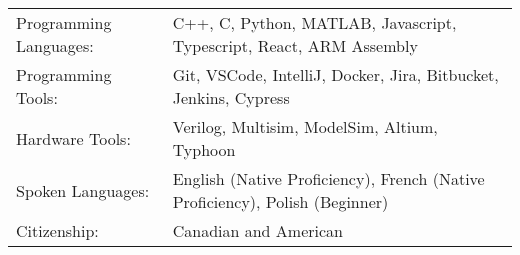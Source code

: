 \begin{tabularx}{\linewidth}{@{}l X@{}}
Programming Languages: &  \normalsize{C++, C, Python, MATLAB, Javascript, Typescript, React, ARM Assembly}\\
Programming Tools:  &  \normalsize{Git, VSCode, IntelliJ, Docker, Jira, Bitbucket, Jenkins, Cypress}\\
Hardware Tools: & \normalsize{Verilog, Multisim, ModelSim, Altium, Typhoon} \\
Spoken Languages:  &  \normalsize{English (Native Proficiency), French (Native Proficiency), Polish (Beginner)}\\ 
Citizenship: &  \normalsize{Canadian and American}\\
\end{tabularx}
